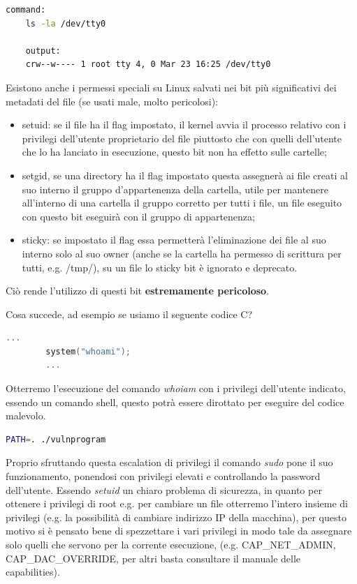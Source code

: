 \begin{lstlisting}[language=bash]
    command:
    ls -la /dev/tty0

    output: 
    crw--w---- 1 root tty 4, 0 Mar 23 16:25 /dev/tty0
\end{lstlisting}

Esistono anche i permessi speciali su Linux salvati nei bit più significativi dei metadati del file (se usati male, molto pericolosi): 
\begin{itemize}
    \item setuid: se il file ha il flag impostato, il kernel avvia il processo relativo con i privilegi dell’utente proprietario del file piuttosto che con quelli dell’utente che lo ha lanciato in esecuzione, questo bit non ha effetto sulle cartelle;
    \item setgid, se una directory ha il flag impostato questa assegnerà ai file creati al suo interno il gruppo d’appartenenza della cartella, utile per mantenere all’interno di una cartella il gruppo corretto per tutti i file, un file eseguito con questo bit eseguirà con il gruppo di appartenenza;
    \item sticky: se impostato il flag essa permetterà l’eliminazione dei file al suo interno solo al suo owner (anche se la cartella ha permesso di scrittura per tutti, e.g. /tmp/), su un file lo sticky bit è ignorato e deprecato.
\end{itemize}
Ciò rende l'utilizzo di questi bit \textbf{estremamente pericoloso}.

\begin{ex}
    Cosa succede, ad esempio se usiamo il seguente codice C?
    
    \begin{lstlisting}[language=C]
        ...
        system("whoami");
        ...
    \end{lstlisting}
    
    Otterremo l'esecuzione del comando \textit{whoiam} con i privilegi dell'utente indicato, essendo un comando shell, questo potrà essere dirottato per eseguire del codice malevolo.

    \begin{lstlisting}[language=bash]
        PATH=. ./vulnprogram
    \end{lstlisting}
\end{ex}
Proprio sfruttando questa escalation di privilegi il comando \textit{sudo} pone il suo funzionamento, ponendosi con privilegi elevati e controllando la password dell'utente.
Essendo \textit{setuid} un chiaro problema di sicurezza, in quanto per ottenere i privilegi di root e.g. per cambiare un file otterremo l'intero insieme di privilegi (e.g. la possibilità di cambiare indirizzo IP della macchina), per questo motivo si è pensato bene di spezzettare i vari privilegi in modo tale da assegnare solo quelli che servono per la corrente esecuzione, (e.g. CAP\_NET\_ADMIN, CAP\_DAC\_OVERRIDE, per altri basta consultare il manuale delle capabilities).
